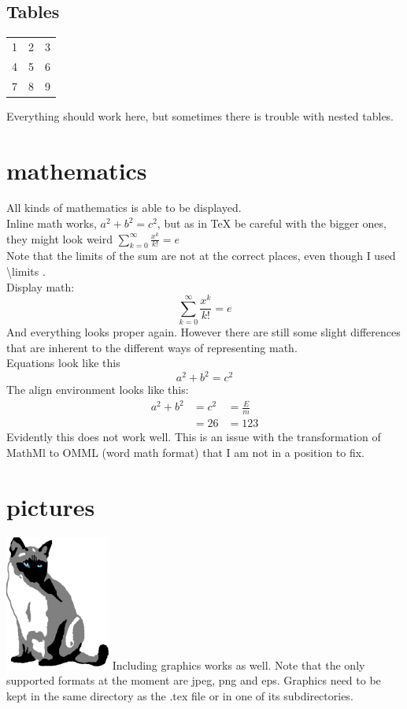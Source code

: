 \documentclass{article}
\begin{document}
\subsection {Tables}
\begin{tabular}{ c c c }
  1 & 2 & 3 \\
  4 & 5 & 6 \\
  7 & 8 & 9 \\
\end{tabular}
Everything should work here, but sometimes there is trouble with nested tables. 

\section{mathematics}
All kinds of mathematics is able to be displayed. \\ 
Inline math works, $a^2+b^2=c^2$, but as in TeX be careful with the bigger ones, they might look weird $\sum\limits_{k=0}^{\infty} \frac{x^k}{k!} =e$ \\
Note that the limits of the sum are not at the correct places, even though I used \textbackslash limits . \\ 
Display math: 
\[
\sum\limits_{k=0}^{\infty} \frac{x^k}{k!} =e
\]
And everything looks proper again. However there are still some slight differences that are inherent to the different ways of representing math. \\
Equations look like this
\begin{equation}
a^2+b^2=c^2
\end{equation}
The align environment looks like this: 
\begin{align}
a^2+b^2&=c^2&=\frac{E}{m} \\ 
&=26 &=123
\end{align}
Evidently this does not work well. This is an issue with the transformation of MathMl to OMML (word math format) that I am not in a position to fix. 
\section{pictures}
\includegraphics{image1.jpeg}
Including graphics works as well. Note that the only supported formats at the moment are jpeg, png and eps. Graphics need to be kept in the same directory as the .tex file or in one of its subdirectories.  \\ 
\end{document}
